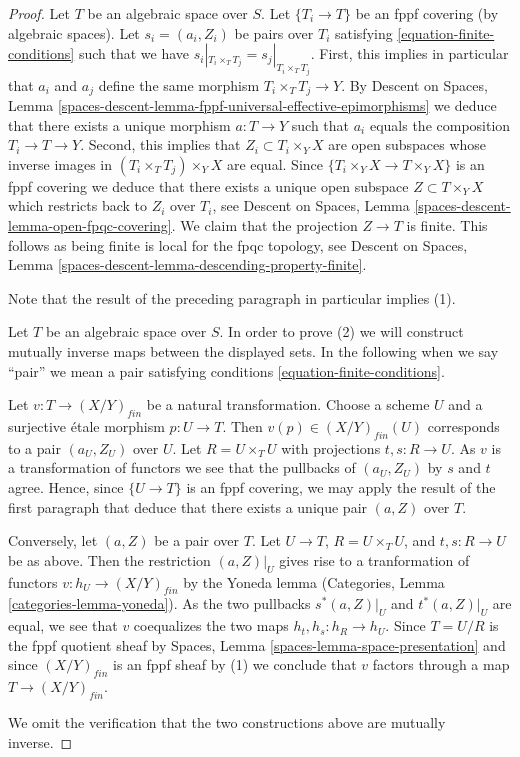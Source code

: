 \begin{proof}
Let $T$ be an algebraic space over $S$.
Let $\{T_i \to T\}$ be an fppf covering (by algebraic spaces).
Let $s_i = (a_i, Z_i)$ be pairs over $T_i$
satisfying \ref{equation-finite-conditions}
such that we have $s_i|_{T_i \times_T T_j} = s_j|_{T_i \times_T T_j}$.
First, this implies in particular that $a_i$ and $a_j$ define the same
morphism $T_i \times_T T_j \to Y$. By
Descent on Spaces,
Lemma \ref{spaces-descent-lemma-fppf-universal-effective-epimorphisms}
we deduce that there exists a unique morphism $a : T \to Y$
such that $a_i$ equals the composition $T_i \to T \to Y$.
Second, this implies that $Z_i \subset T_i \times_Y X$ are open subspaces
whose inverse images in $(T_i \times_T T_j) \times_Y X$ are equal.
Since $\{T_i \times_Y X \to T \times_Y X\}$ is an fppf covering
we deduce that there exists a unique open subspace $Z \subset T \times_Y X$
which restricts back to $Z_i$ over $T_i$, see
Descent on Spaces, Lemma \ref{spaces-descent-lemma-open-fpqc-covering}.
We claim that the projection $Z \to T$ is finite.
This follows as being finite is local for the fpqc topology, see
Descent on Spaces, Lemma \ref{spaces-descent-lemma-descending-property-finite}.

\medskip\noindent
Note that the result of the preceding paragraph in particular implies (1).

\medskip\noindent
Let $T$ be an algebraic space over $S$. In order to prove (2) we will
construct mutually inverse maps between the displayed sets. In the
following when we say ``pair'' we mean a pair satisfying
conditions \ref{equation-finite-conditions}.

\medskip\noindent
Let $v : T \to (X/Y)_{fin}$ be a natural transformation.
Choose a scheme $U$ and a surjective \'etale morphism $p : U \to T$.
Then $v(p) \in (X/Y)_{fin}(U)$ corresponds to a pair $(a_U, Z_U)$
over $U$. Let $R = U \times_T U$ with projections $t, s : R \to U$.
As $v$ is a transformation of functors we see that the pullbacks of
$(a_U, Z_U)$ by $s$ and $t$ agree. Hence, since $\{U \to T\}$ is an
fppf covering, we may apply the result of the first paragraph that
deduce that there exists a unique pair $(a, Z)$ over $T$.

\medskip\noindent
Conversely, let $(a, Z)$ be a pair over $T$.
Let $U \to T$, $R = U \times_T U$, and $t, s : R \to U$ be as
above. Then the restriction $(a, Z)|_U$ gives rise to a
tranformation of functors $v : h_U \to (X/Y)_{fin}$ by the
Yoneda lemma
(Categories, Lemma \ref{categories-lemma-yoneda}).
As the two pullbacks $s^*(a, Z)|_U$ and $t^*(a, Z)|_U$
are equal, we see that $v$ coequalizes the two maps
$h_t, h_s : h_R \to h_U$. Since $T = U/R$ is the fppf quotient sheaf by
Spaces, Lemma \ref{spaces-lemma-space-presentation}
and since $(X/Y)_{fin}$ is an fppf sheaf by (1) we conclude
that $v$ factors through a map $T \to (X/Y)_{fin}$.

\medskip\noindent
We omit the verification that the two constructions above are mutually
inverse.
\end{proof}

